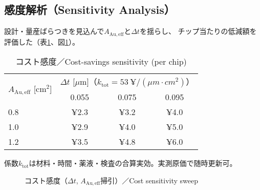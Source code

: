 \documentclass[conference]{IEEEtran}
\begin{document}
\subsection{感度解析（Sensitivity Analysis）}
設計・量産ばらつきを見込んで$A_{\mathrm{Au,eff}}$と$\Delta t$を揺らし、
チップ当たりの低減額を評価した（表\ref{tab:cost-sense}、図\ref{fig:cost-sense}）。
\begin{table}[htbp]
  \centering
  \caption{コスト感度／Cost-savings sensitivity (per chip)}
  \label{tab:cost-sense}
  \begin{tabular}{@{}lccc@{}}
    \toprule
    \multirow{2}{*}{$A_{\mathrm{Au,eff}}$ [cm$^2$]} &
    \multicolumn{3}{c}{$\Delta t$ [$\mu$m]（$k_{\mathrm{tot}}=\SI{53}{¥/(\mu m\cdot cm^2)}$）}\\
    \cmidrule(l){2-4}
     & 0.055 & 0.075 & 0.095 \\
    \midrule
    0.8 & ¥2.3 & ¥3.2 & ¥4.0 \\
    1.0 & ¥2.9 & ¥4.0 & ¥5.0 \\
    1.2 & ¥3.5 & ¥4.8 & ¥6.0 \\
    \bottomrule
  \end{tabular}
  \vspace{2pt}
  \footnotesize 係数$k_{\mathrm{tot}}$は材料・時間・薬液・検査の合算実効。実測原価で随時更新可。
\end{table}

\begin{figure}[htbp]
  \centering
  \caption{コスト感度（$\Delta t$, $A_{\mathrm{Au,eff}}$掃引）／Cost sensitivity sweep}
  \label{fig:cost-sense}
\end{figure}
\end{document}
